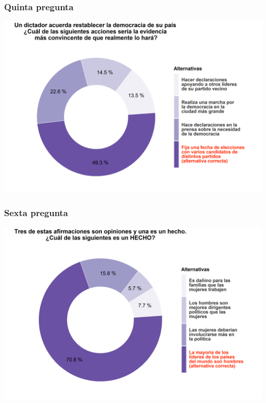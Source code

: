 \documentclass[
  14pt,
]{book}
\begin{document}
\hypertarget{quinta-pregunta}{%
\subsubsection{Quinta pregunta}\label{quinta-pregunta}}

\begin{center}\includegraphics[width=52.49in]{images/ccivico_5} \end{center}

\hypertarget{sexta-pregunta}{%
\subsubsection{Sexta pregunta}\label{sexta-pregunta}}

\begin{center}\includegraphics[width=52.49in]{images/ccivico_6} \end{center}
\end{document}
